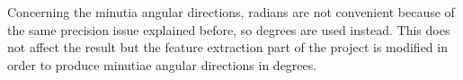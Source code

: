 \documentclass[a4paper,12pt]{article}
\begin{document}
\begin{table}[h]
\centering
{}
\caption{Command \texttt{APDU} content for initiating matching process}
\label{tab:apducmd:mach}
\end{table}

Concerning the minutia angular directions, radians are not convenient because of the same precision issue explained before, so degrees are used instead. This does not affect the result but the feature extraction part of the project is modified in order to produce minutiae angular directions in degrees.
\end{document}

